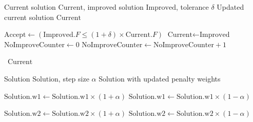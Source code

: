 \documentclass{article}
\begin{document}
\begin{algorithm}[H]
\caption{Acceptance Criterion}
\begin{algorithmic}[1]
\Require Current solution $\text{Current}$, improved solution $\text{Improved}$, tolerance $\delta$
\Ensure Updated current solution $\text{Current}$

\State $\text{Accept} \gets (\text{Improved}.F \le (1 + \delta) \times \text{Current}.F)$
    \State $\text{Current} \gets \text{Improved}$
    \State $\text{NoImproveCounter} \gets 0$
\Else
    \State $\text{NoImproveCounter} \gets \text{NoImproveCounter} + 1$
\EndIf

\State {}\
\State \Return $\text{Current}$
\end{algorithmic}
\end{algorithm}

\begin{algorithm}[H]
\caption{Adjust Penalties}
\begin{algorithmic}[1]
\Require Solution $\text{Solution}$, step size $\alpha$
\Ensure Solution with updated penalty weights

    \State $\text{Solution.w1} \gets \text{Solution.w1} \times (1 + \alpha)$
\Else
    \State $\text{Solution.w1} \gets \text{Solution.w1} \times (1 - \alpha)$
\EndIf

    \State $\text{Solution.w2} \gets \text{Solution.w2} \times (1 + \alpha)$
\Else
    \State $\text{Solution.w2} \gets \text{Solution.w2} \times (1 - \alpha)$
\EndIf

\end{algorithmic}
\end{algorithm}
\end{document}
